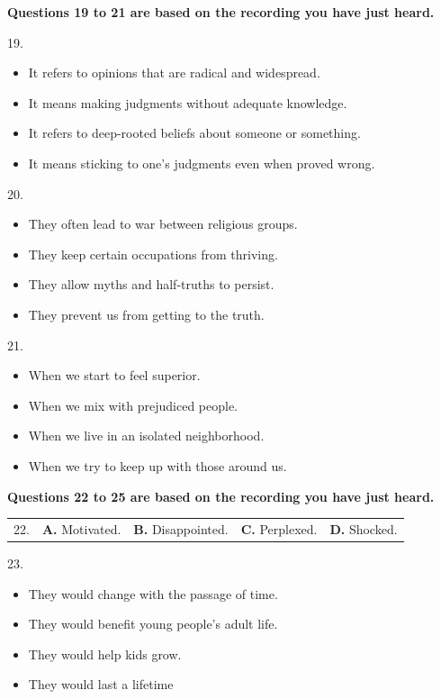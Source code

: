 \documentclass[UTF8,11pt]{ctexart}
\begin{document}
\textbf{Questions 19 to 21 are based on the recording you have just heard.}


19.


\begin{itemize}[leftmargin=2em,itemsep=.2em,topsep=.4em]\item[A.] It refers to opinions that are radical and widespread.
\item[B.] It means making judgments without adequate knowledge.
\item[C.] It refers to deep-rooted beliefs about someone or something.
\item[D.] It means sticking to one’s judgments even when proved wrong.
\end{itemize}

20.


\begin{itemize}[leftmargin=2em,itemsep=.2em,topsep=.4em]\item[A.] They often lead to war between religious groups.
\item[B.] They keep certain occupations from thriving.
\item[C.] They allow myths and half-truths to persist.
\item[D.] They prevent us from getting to the truth.
\end{itemize}

21.


\begin{itemize}[leftmargin=2em,itemsep=.2em,topsep=.4em]\item[A.] When we start to feel superior.
\item[B.] When we mix with prejudiced people.
\item[C.] When we live in an isolated neighborhood.
\item[D.] When we try to keep up with those around us.
\end{itemize}

\textbf{Questions 22 to 25 are based on the recording you have just heard.}


\noindent\begin{tabularx}{\linewidth}{@{}lXXXX@{}}22. & \textbf{A.} Motivated. & \textbf{B.} Disappointed. & \textbf{C.} Perplexed. & \textbf{D.} Shocked.\\\end{tabularx}\par

23.


\begin{itemize}[leftmargin=2em,itemsep=.2em,topsep=.4em]\item[A.] They would change with the passage of time.
\item[B.] They would benefit young people’s adult life.
\item[C.] They would help kids grow.
\item[D.] They would last a lifetime
\end{itemize}
\end{document}
